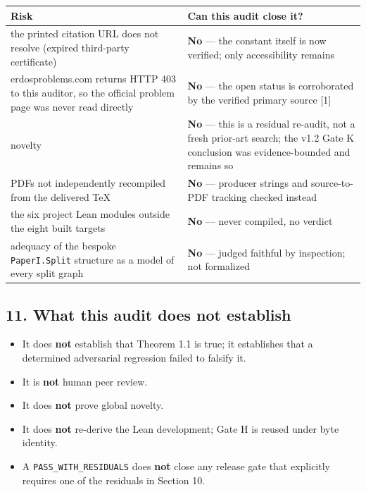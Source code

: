 \documentclass[
  9pt,
  a4paper,
]{article}
\newcounter{none} %
\providecommand{\tightlist}{%
  \setlength{\itemsep}{0pt}\setlength{\parskip}{0pt}}
\begin{document}
{\def\LTcaptype{none} %
\begin{longtable}[]{@{}ll@{}}
\toprule\noalign{}
Risk & Can this audit close it? \\
\midrule\noalign{}
\endhead
\bottomrule\noalign{}
\endlastfoot
the printed citation URL does not resolve (expired third-party
certificate) & \textbf{No} --- the constant itself is now verified; only
accessibility remains \\
erdosproblems.com returns HTTP 403 to this auditor, so the official
problem page was never read directly & \textbf{No} --- the open status
is corroborated by the verified primary source {[}1{]} \\
novelty & \textbf{No} --- this is a residual re-audit, not a fresh
prior-art search; the v1.2 Gate K conclusion was evidence-bounded and
remains so \\
PDFs not independently recompiled from the delivered TeX & \textbf{No}
--- producer strings and source-to-PDF tracking checked instead \\
the six project Lean modules outside the eight built targets &
\textbf{No} --- never compiled, no verdict \\
adequacy of the bespoke \texttt{PaperI.Split} structure as a model of
every split graph & \textbf{No} --- judged faithful by inspection; not
formalized \\
\end{longtable}
}

\subsection{11. What this audit does not
establish}\label{11-what-this-audit-does-not-establish}

\begin{itemize}
\tightlist
\item
  It does \textbf{not} establish that Theorem 1.1 is true; it
  establishes that a determined adversarial regression failed to falsify
  it.
\item
  It is \textbf{not} human peer review.
\item
  It does \textbf{not} prove global novelty.
\item
  It does \textbf{not} re-derive the Lean development; Gate H is reused
  under byte identity.
\item
  A \texttt{PASS\_WITH\_RESIDUALS} does \textbf{not} close any release
  gate that explicitly requires one of the residuals in Section 10.
\end{itemize}
\end{document}
